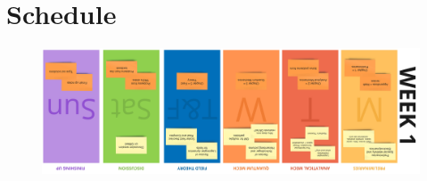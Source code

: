 \chapter*{Schedule}

\pagebreak
\begin{landscape}
\begin{figure}[hbtp]
\includegraphics[scale=0.095]{Figures/Week1.jpg}
\end{figure}
\end{landscape}


